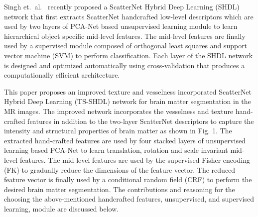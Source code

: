 \documentclass[10pt,twocolumn,letterpaper]{article}
\begin{document}
Singh et.~al.~\cite{shdl} recently proposed a ScatterNet Hybrid Deep Learning (SHDL) network that first extracts ScatterNet handcrafted low-level descriptors which are used by two layers of PCA-Net based unsupervised learning module to learn hierarchical object specific mid-level features. The mid-level features are finally used by a supervised module composed of orthogonal least squares and support vector machine (SVM) to perform classification. Each layer of the SHDL network is designed and optimized automatically using cross-validation that produces a computationally efficient architecture.

This paper proposes an improved texture and vesselness incorporated ScatterNet Hybrid Deep Learning (TS-SHDL) network for brain matter segmentation in the MR images. The improved network incorporates the vesselness and texture hand-crafted features in addition to the two-layer ScatterNet descriptors to capture the intensity and structural properties of brain matter as shown in Fig. 1. The extracted hand-crafted features are used by four stacked layers of unsupervised learning based PCA-Net to learn translation, rotation and scale invariant mid-level features. The mid-level features are used by the supervised Fisher encoding (FK) to gradually reduce the dimensions of the feature vector. The reduced feature vector is finally used by a conditional random field (CRF) to perform the desired brain matter segmentation. The contributions and reasoning for the choosing the above-mentioned handcrafted features, unsupervised, and supervised learning, module are discussed below. 
\end{document}
